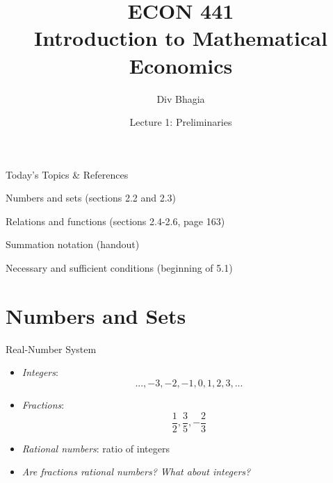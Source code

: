 \documentclass{./../../Latex/teaching_slides}
\begin{document}
\title{ECON 441 \\ \vspace{0.4em} \normalsize Introduction to Mathematical Economics}
\author{Div Bhagia}
\date{Lecture 1: Preliminaries}

\begin{frame}
\maketitle
\end{frame}


\begin{frame}{Today's Topics \& References}
\begin{witemize}
\item Numbers and sets (sections 2.2 and 2.3)
\item Relations and functions (sections 2.4-2.6, page 163)
\item Summation notation (handout)
\item Necessary and sufficient conditions (beginning of 5.1) 
\end{witemize}
\end{frame}

\section{Numbers and Sets}
\begin{frame}{Real-Number System}
\begin{itemize}
\item \textit{Integers}: 
$$...,-3,-2,-1,0,1,2,3,...$$
\item \pause \textit{Fractions}: 
$$ \frac{1}{2}, \frac{3}{5}, -\frac{2}{3}$$
\vspace{0.25em}
\item \pause \textit{Rational numbers}: ratio of integers 
\vspace{0.25em}
\item[] \pause \textit{Are fractions rational numbers? What about integers?}
\end{itemize}
\end{frame}
\end{document}

